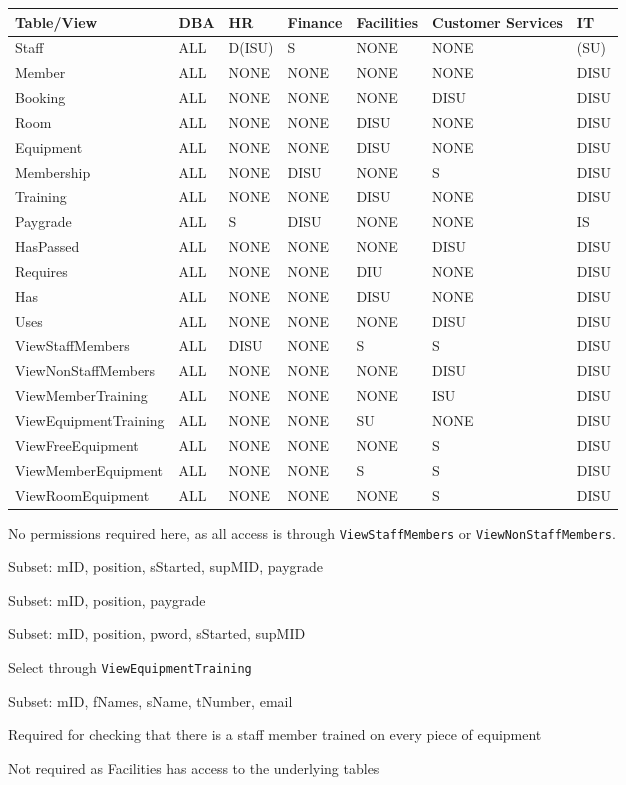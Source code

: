\documentclass[a4paper, titlepage]{article}
\begin{document}
\begin{threeparttable}
\begin{tabulary}{1.2\textwidth}{L |llllll}
	Table/View & DBA & HR & Finance & Facilities & Customer Services & IT \\ \midrule
	Staff & ALL & D(ISU) & S & NONE & NONE & (SU) \\
	Member & ALL & NONE & NONE & NONE & NONE & DISU \\
	Booking & ALL & NONE & NONE & NONE & DISU & DISU \\
	Room & ALL & NONE & NONE & DISU & NONE & DISU \\
	Equipment & ALL & NONE & NONE & DISU & NONE & DISU \\
	Membership & ALL & NONE & DISU & NONE & S & DISU \\
	Training & ALL & NONE & NONE & DISU & NONE & DISU \\
	Paygrade & ALL & S & DISU & NONE & NONE & IS \\
	HasPassed & ALL & NONE & NONE & NONE & DISU & DISU \\
	Requires & ALL & NONE & NONE & DIU & NONE & DISU \\
	Has & ALL & NONE & NONE & DISU & NONE & DISU \\
	Uses & ALL & NONE & NONE & NONE & DISU & DISU \\
	ViewStaffMembers & ALL & DISU & NONE & S & S & DISU \\
	ViewNonStaffMembers & ALL & NONE & NONE & NONE & DISU & DISU \\
	ViewMemberTraining & ALL & NONE & NONE & NONE & ISU & DISU \\
	ViewEquipmentTraining & ALL & NONE & NONE & SU & NONE & DISU \\
	ViewFreeEquipment & ALL & NONE & NONE & NONE & S & DISU \\
	ViewMemberEquipment & ALL & NONE & NONE & S & S & DISU \\
	ViewRoomEquipment & ALL & NONE & NONE & NONE & S & DISU \\
	\bottomrule
\end{tabulary}
\begin{tablenotes}
	\item[1] No permissions required here, as all access is through \texttt{ViewStaffMembers} or \texttt{ViewNonStaffMembers}.
	\item[a] Subset: mID, position, sStarted, supMID, paygrade
	\item[b] Subset: mID, position, paygrade
	\item[c] Subset: mID, position, pword, sStarted, supMID
	\item[d] Select through \texttt{ViewEquipmentTraining}
	\item[e] Subset: mID, fNames, sName, tNumber, email
	\item[f] Required for checking that there is a staff member trained on every piece of equipment
	\item[g] Not required as Facilities has access to the underlying tables
\end{tablenotes}
\end{threeparttable}
\end{document}

